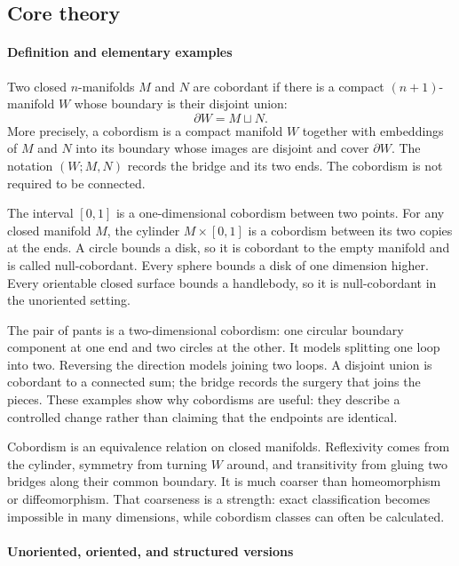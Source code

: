 \subsection*{Core theory}
\paragraph{Definition and elementary examples}

Two closed $n$-manifolds $M$ and $N$ are cobordant if there is a compact $(n+1)$-manifold $W$ whose boundary is their disjoint union:
\[
 \partial W=M\sqcup N.
\]
More precisely, a cobordism is a compact manifold $W$ together with embeddings of $M$ and $N$ into its boundary whose images are disjoint and cover $\partial W$. The notation $(W;M,N)$ records the bridge and its two ends. The cobordism is not required to be connected.

The interval $[0,1]$ is a one-dimensional cobordism between two points. For any closed manifold $M$, the cylinder $M\times[0,1]$ is a cobordism between its two copies at the ends. A circle bounds a disk, so it is cobordant to the empty manifold and is called null-cobordant. Every sphere bounds a disk of one dimension higher. Every orientable closed surface bounds a handlebody, so it is null-cobordant in the unoriented setting.

The pair of pants is a two-dimensional cobordism: one circular boundary component at one end and two circles at the other. It models splitting one loop into two. Reversing the direction models joining two loops. A disjoint union is cobordant to a connected sum; the bridge records the surgery that joins the pieces. These examples show why cobordisms are useful: they describe a controlled change rather than claiming that the endpoints are identical. \cite{cobordism_theory_ref1,cobordism_theory_ref5}

Cobordism is an equivalence relation on closed manifolds. Reflexivity comes from the cylinder, symmetry from turning $W$ around, and transitivity from gluing two bridges along their common boundary. It is much coarser than homeomorphism or diffeomorphism. That coarseness is a strength: exact classification becomes impossible in many dimensions, while cobordism classes can often be calculated.

\paragraph{Unoriented, oriented, and structured versions}

